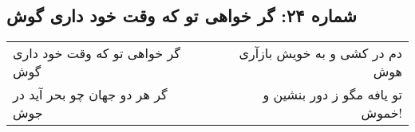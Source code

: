 \begin{center}
\section*{شماره ۲۴: گر خواهی تو که وقت خود داری گوش}
\label{sec:024}
\begin{longtable}{l p{0.5cm} r}
گر خواهی تو که وقت خود داری گوش
&&
دم در کشی و به خویش بازآری هوش
\\
گر هر دو جهان چو بحر آید در جوش
&&
تو یافه مگو ز دور بنشین و خموش!
\\
\end{longtable}
\end{center}
